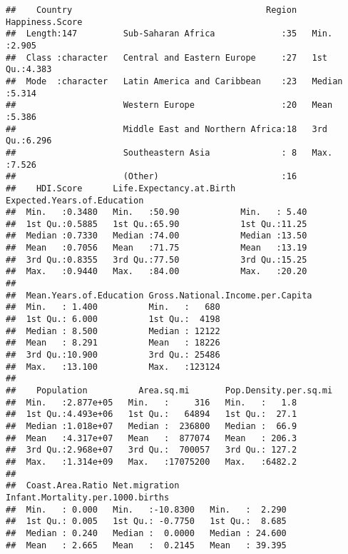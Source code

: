 \documentclass[]{article}
\begin{document}
\begin{verbatim}
##    Country                                      Region   Happiness.Score
##  Length:147         Sub-Saharan Africa             :35   Min.   :2.905  
##  Class :character   Central and Eastern Europe     :27   1st Qu.:4.383  
##  Mode  :character   Latin America and Caribbean    :23   Median :5.314  
##                     Western Europe                 :20   Mean   :5.386  
##                     Middle East and Northern Africa:18   3rd Qu.:6.296  
##                     Southeastern Asia              : 8   Max.   :7.526  
##                     (Other)                        :16                  
##    HDI.Score      Life.Expectancy.at.Birth Expected.Years.of.Education
##  Min.   :0.3480   Min.   :50.90            Min.   : 5.40              
##  1st Qu.:0.5885   1st Qu.:65.90            1st Qu.:11.25              
##  Median :0.7330   Median :74.00            Median :13.50              
##  Mean   :0.7056   Mean   :71.75            Mean   :13.19              
##  3rd Qu.:0.8355   3rd Qu.:77.50            3rd Qu.:15.25              
##  Max.   :0.9440   Max.   :84.00            Max.   :20.20              
##                                                                       
##  Mean.Years.of.Education Gross.National.Income.per.Capita
##  Min.   : 1.400          Min.   :   680                  
##  1st Qu.: 6.000          1st Qu.:  4198                  
##  Median : 8.500          Median : 12122                  
##  Mean   : 8.291          Mean   : 18226                  
##  3rd Qu.:10.900          3rd Qu.: 25486                  
##  Max.   :13.100          Max.   :123124                  
##                                                          
##    Population          Area.sq.mi       Pop.Density.per.sq.mi
##  Min.   :2.877e+05   Min.   :     316   Min.   :   1.8       
##  1st Qu.:4.493e+06   1st Qu.:   64894   1st Qu.:  27.1       
##  Median :1.018e+07   Median :  236800   Median :  66.9       
##  Mean   :4.317e+07   Mean   :  877074   Mean   : 206.3       
##  3rd Qu.:2.968e+07   3rd Qu.:  700057   3rd Qu.: 127.2       
##  Max.   :1.314e+09   Max.   :17075200   Max.   :6482.2       
##                                                              
##  Coast.Area.Ratio Net.migration      Infant.Mortality.per.1000.births
##  Min.   : 0.000   Min.   :-10.8300   Min.   :  2.290                 
##  1st Qu.: 0.005   1st Qu.: -0.7750   1st Qu.:  8.685                 
##  Median : 0.240   Median :  0.0000   Median : 24.600                 
##  Mean   : 2.665   Mean   :  0.2145   Mean   : 39.395                 

\end{verbatim}
\end{document}

